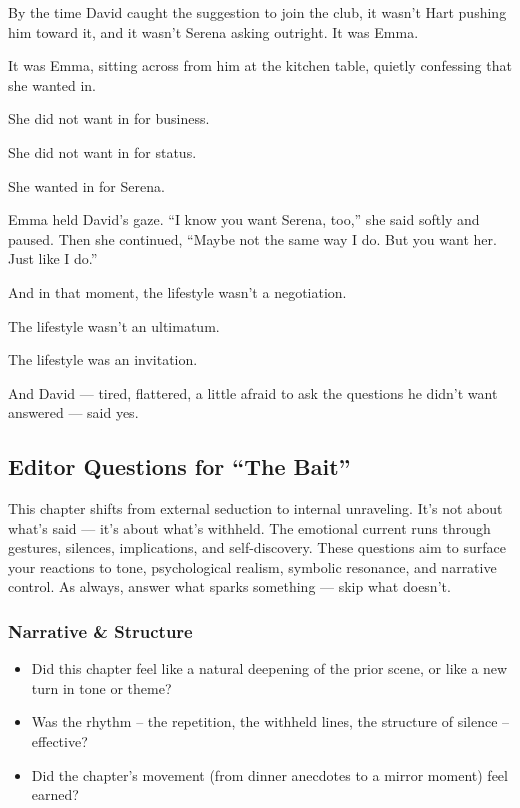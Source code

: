\medskip

By the time David caught the suggestion to join the club, it wasn’t Hart pushing him toward it, and it wasn’t Serena asking 
outright. It was Emma.  

It was Emma, sitting across from him at the kitchen table, quietly confessing that she wanted in.  

She did not want in for business.  

She did not want in for status.  

She wanted in for Serena.

Emma held David's gaze.  ``I know you want Serena, too,'' she said softly and paused.  
Then she continued, ``Maybe not the same way I do. But you want her. Just like I do.''

And in that moment, the lifestyle wasn’t a negotiation.  

The lifestyle wasn’t an ultimatum.  

The lifestyle was an invitation.

And David --- tired, flattered, a little afraid to ask the questions he didn’t want answered ---  
said yes.


\subsection{Editor Questions for ``The Bait''}

This chapter shifts from external seduction to internal unraveling. It’s not about what’s said — it’s about what’s withheld. The emotional current runs through gestures, silences, implications, and self-discovery. These questions aim to surface your reactions to tone, psychological realism, symbolic resonance, and narrative control. As always, answer what sparks something — skip what doesn’t.

\subsubsection{Narrative \& Structure}

\begin{itemize}
  \item Did this chapter feel like a natural deepening of the prior scene, or like a new turn in tone or theme?
  \item Was the rhythm -- the repetition, the withheld lines, the structure of silence -- effective?
  \item Did the chapter’s movement (from dinner anecdotes to a mirror moment) feel earned?
\end{itemize}

